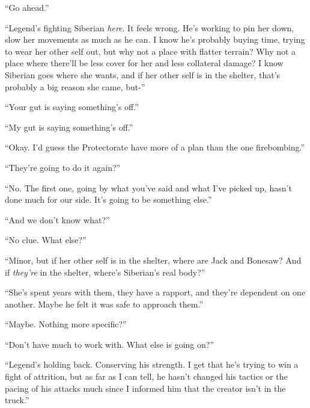 ``Go ahead.''



``Legend's fighting Siberian \emph{here}.  It feels wrong.  He's working to pin her down, slow her movements as much as he can.  I know he's probably buying time, trying to wear her other self out, but why not a place with flatter terrain?  Why not a place where there'll be less cover for her and less collateral damage?  I know Siberian goes where she wants, and if her other self is in the shelter, that's probably a big reason she came, but-''



``Your gut is saying something's off.''



``My gut is saying something's off.''



``Okay.  I'd guess the Protectorate have more of a plan than the one firebombing.''



``They're going to do it again?''



``No.  The first one, going by what you've said and what I've picked up, hasn't done much for our side.  It's going to be something else.''



``And we don't know what?''



``No clue.  What else?''



``Minor, but if her other self is in the shelter, where are Jack and Bonesaw?  And if \emph{they're }in the shelter, where's Siberian's real body?''



``She's spent years with them, they have a rapport, and they're dependent on one another. Maybe he felt it was safe to approach them.''



``Maybe.  Nothing more specific?''



``Don't have much to work with.  What else is going on?''



``Legend's holding back.  Conserving his strength.  I get that he's trying to win a fight of attrition, but as far as I can tell, he hasn't changed his tactics or the pacing of his attacks much since I informed him that the creator isn't in the truck.''



